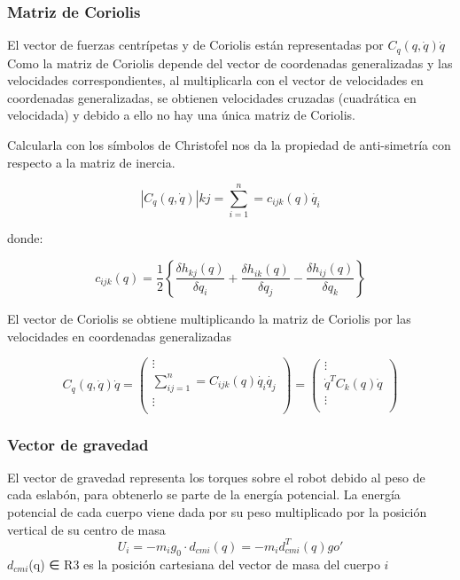     \subsubsection{Matriz de Coriolis}
    El vector de fuerzas centrípetas y de Coriolis están representadas por $C_{q}(q,\dot{q})\dot{q}$ 
    Como la matriz de Coriolis depende del vector de coordenadas generalizadas y las velocidades correspondientes, al
    multiplicarla con el vector de velocidades en coordenadas generalizadas, se obtienen velocidades cruzadas (cuadrática en velocidada)
    y debido a ello no hay una única matriz de Coriolis. 

    Calcularla con los símbolos de Christofel nos da la propiedad de anti-simetría con respecto a la matriz de inercia.

    $$\left | C_{q}(q,\dot{q}) \right |{k j}=\sum_{i=1}^{n}=c_{ijk}(q)\dot{q_{i}}$$

    donde: 

    $$c_{ijk}(q)=\frac{1}{2}\left \{ \frac{\delta h_{kj}(q)}{\delta q_{i}}+\frac{\delta h_{ik}(q)}{\delta q_{j}}
                 -\frac{\delta h_{ij}(q)}{\delta q_{k}} \right \}$$

    El vector de Coriolis se obtiene multiplicando la matriz de Coriolis por las velocidades en coordenadas generalizadas

    $$C_{q}(q,\dot{q})\dot{q}=\begin{pmatrix}
    \vdots\\
    \sum_{ij=1}^{n}=C_{ijk}(q)\dot{q_{i}}\dot{q_{j}}\\ 
    \vdots\\
    \end{pmatrix}
    =\begin{pmatrix}
    \vdots\\
    \dot{q}^{T}C_{k}(q)\dot{q}\\ 
    \vdots\\
    \end{pmatrix}$$

    \subsubsection{Vector de gravedad}
    El vector de gravedad representa los torques sobre el robot debido al peso de cada eslabón, para obtenerlo se parte
    de la energía potencial. La energía potencial de cada cuerpo viene dada por su peso multiplicado por la posición
    vertical de su centro de masa
    $$U_{i}=-m_{i}g_{0}\cdot d_{cmi}(q)=-m_{i}d^{T}_{cmi}(q)g{o'}$$
    $d_{cmi}$(q) ∈ R3 es la posición cartesiana del vector de masa del cuerpo $i$

